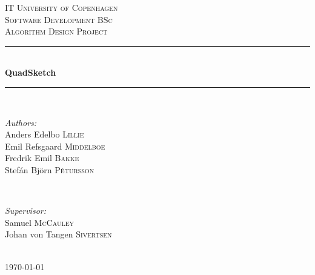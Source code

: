 \documentclass{article}
\begin{document}
%
\begin{titlepage}
	
	\newcommand{\HRule}{\rule{\linewidth}{0.5mm}} %
	
	\center %
	
	\textsc{\LARGE IT University of Copenhagen}\\[1.5cm] %
	\textsc{\Large Software Development BSc}\\[0.5cm] %
	\textsc{\large Algorithm Design Project}\\[0.5cm] %
	
	\HRule \\[0.4cm]
	{ \huge \bfseries QuadSketch}\\[0.4cm] %
	\HRule \\[1.5cm]
	
	\begin{minipage}{0.5\textwidth}
		\begin{flushleft} \large
			\emph{Authors:}\\
			Anders Edelbo \textsc{Lillie} \\
			Emil Refsgaard \textsc{Middelboe} \\
			Fredrik Emil \textsc{Bakke} \\
			Stefán Björn \textsc{Pétursson}
		\end{flushleft}
	\end{minipage}
	~
	\begin{minipage}{0.4\textwidth}
		\begin{flushright} \large
			\emph{Supervisor:} \\
			Samuel \textsc{McCauley} \\
			Johan von Tangen \textsc{Sivertsen}
		\end{flushright}
	\end{minipage}\\[4cm]
	
	{\large \today}\\[3cm] 
	
	\vfill %
	
\end{titlepage}

\begin{abstract}
\end{abstract}
\clearpage

\tableofcontents
\clearpage
{} %
	


%
\clearpage



 
\clearpage

\appendix

	
\end{document}
